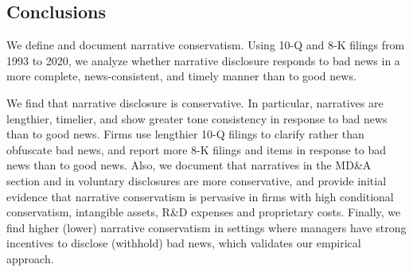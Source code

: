 \documentclass[letterpaper,12pt]{article}
\begin{document}
\begin{spacing}{1.5}
\section{Conclusions}

\noindent We define and document narrative conservatism. Using 10-Q and 8-K filings from 1993 to 2020, we analyze whether narrative disclosure responds to bad news in a more complete, news-consistent, and timely manner than to good news. 

We find that narrative disclosure is conservative. In particular, narratives are lengthier, timelier, and show greater tone consistency in response to bad news than to good news. Firms use lengthier 10-Q filings to clarify rather than obfuscate bad news, and report more 8-K filings and items in response to bad news than to good news. Also, we document that narratives in the MD\&A section and in voluntary disclosures are more conservative, and provide initial evidence that narrative conservatism is pervasive in firms with high conditional conservatism, intangible assets, R\&D expenses and proprietary costs. Finally, we find higher (lower) narrative conservatism in settings where managers have strong incentives to disclose (withhold) bad news, which validates our empirical approach.


\end{spacing}
\end{document}
